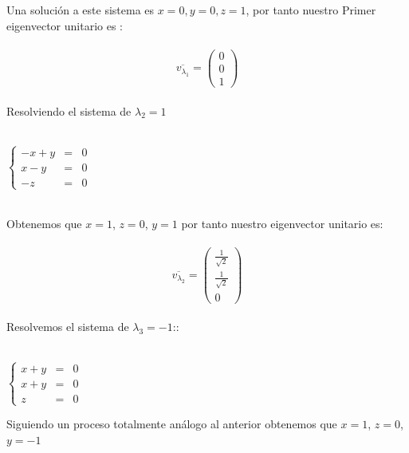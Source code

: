 \documentclass[11pt,letterpaper]{article}
\begin{document}
    Una soluci\'on a este sistema es $x=0,y=0,z=1$, por tanto nuestro Primer
    eigenvector unitario es :\,\\
    \,\\
    \begin{equation*}
        \overline{v_{\lambda_1}}=  
        \begin{pmatrix}
                0 \\
                0\\
                1
                \end{pmatrix}
    \end{equation*}\,\\
    Resolviendo el sistema de $\lambda_2=1$\,\\
    \,\\
     \begin{center}
       $\left\{ 
         \begin{array}{rcl}
            -x+y&=&0\\
            x-y&=&0\\
            -z&=&0
         \end{array}
       \right.$
        \end{center}
    \,\\
    Obtenemos que $x=1$, $z=0$, $y=1$ por tanto
    nuestro eigenvector unitario es:\,\\
    \,\\
    \begin{equation*}
        \overline{v_{\lambda_2}}=\begin{pmatrix}
                \frac{1}{\sqrt{2}}\\
                \frac{1}{\sqrt{2}}\\
                0
                \end{pmatrix}
    \end{equation*}\,\\
    Resolvemos el sistema de $\lambda_3=-1$::\,\\
    \,\\
    \begin{center}
     $\left\{ 
         \begin{array}{rcl}
            x+y&=&0\\
            x+y&=&0\\
            z&=&0
         \end{array}
       \right.$\,\\
        \end{center}
    Siguiendo un proceso totalmente an\'alogo al anterior  obtenemos que $x=1$, $z=0$, $y=-1$
\end{document}
